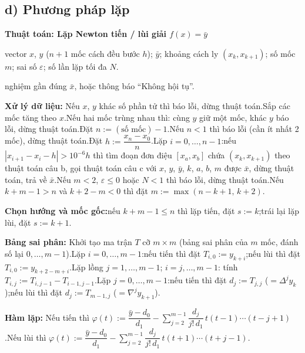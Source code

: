 \documentclass[11pt,a4paper]{article}
\newenvironment{thuattoan}[1]
  {\par\medskip\noindent\textbf{Thuật toán: #1}\begin{description}[style=standard,align=left,leftmargin=4.3em,labelwidth=3.9em,labelsep=0.4em,itemsep=1pt,topsep=3pt,font=\normalfont\bfseries]}
  {\end{description}}
\newcommand{\thut}{\newline\hspace*{1.2em}}
\begin{document}
\subsection{d) Phương pháp lặp}
\begin{thuattoan}{Lặp Newton tiến / lùi giải $f(x)=\bar y$}
\item[Input:] vector $x$, $y$ ($n+1$ mốc cách đều bước $h$); $\bar y$; khoảng cách ly $(x_k,x_{k+1})$; số mốc $m$; sai số $\varepsilon$; số lần lặp tối đa $N$.
\item[Output:] nghiệm gần đúng $\bar x$, hoặc thông báo ``Không hội tụ''.
\item[Bước 0:] \textbf{Xử lý dữ liệu:} Nếu $x$, $y$ khác số phần tử thì báo lỗi, dừng thuật toán.\newline Sắp các mốc tăng theo $x$.\newline Nếu hai mốc trùng nhau thì: cùng $y$ giữ một mốc, khác $y$ báo lỗi, dừng thuật toán.\newline Đặt $n:=(\text{số mốc})-1$.\newline Nếu $n<1$ thì báo lỗi (cần ít nhất 2 mốc), dừng thuật toán.\newline Đặt $h:=\dfrac{x_n-x_0}{n}$.\newline Lặp $i=0,\dots,n-1$:\thut nếu $|x_{i+1}-x_i-h|>10^{-6}h$ thì tìm đoạn đơn điệu $[x_a,x_b]$ chứa $(x_k,x_{k+1})$ theo thuật toán câu b, gọi thuật toán câu c với $x$, $y$, $\bar y$, $k$, $a$, $b$, $m$ được $\bar x$, dừng thuật toán, trả về $\bar x$.\newline Nếu $m<2$, $\varepsilon\le0$ hoặc $N<1$ thì báo lỗi, dừng thuật toán.\newline Nếu $k+m-1>n$ và $k+2-m<0$ thì đặt $m:=\max(n-k+1,\,k+2)$.
\item[Bước 1:] \textbf{Chọn hướng và mốc gốc:}\thut nếu $k+m-1\le n$ thì lặp tiến, đặt $s:=k$;\thut trái lại lặp lùi, đặt $s:=k+1$.
\item[Bước 2:] \textbf{Bảng sai phân:} Khởi tạo ma trận $T$ cỡ $m\times m$ (bảng sai phân của $m$ mốc, đánh số lại $0,\dots,m-1$).\newline Lặp $i=0,\dots,m-1$:\thut nếu tiến thì đặt $T_{i,0}:=y_{k+i}$;\thut nếu lùi thì đặt $T_{i,0}:=y_{k+2-m+i}$.\newline Lặp lồng $j=1,\dots,m-1$; $i=j,\dots,m-1$: tính $T_{i,j}:=T_{i,j-1}-T_{i-1,j-1}$.\newline Lặp $j=0,\dots,m-1$:\thut nếu tiến thì đặt $d_j:=T_{j,j}$ ($=\Delta^jy_k$);\thut nếu lùi thì đặt $d_j:=T_{m-1,j}$ ($=\nabla^jy_{k+1}$).
\item[Bước 3:] \textbf{Hàm lặp:} Nếu tiến thì $\varphi(t):=\dfrac{\bar y-d_0}{d_1}-\sum_{j=2}^{m-1}\dfrac{d_j}{j!\,d_1}\,t(t-1)\cdots(t-j+1)$.\newline Nếu lùi thì $\varphi(t):=\dfrac{\bar y-d_0}{d_1}-\sum_{j=2}^{m-1}\dfrac{d_j}{j!\,d_1}\,t(t+1)\cdots(t+j-1)$.

\end{thuattoan}
\end{document}
